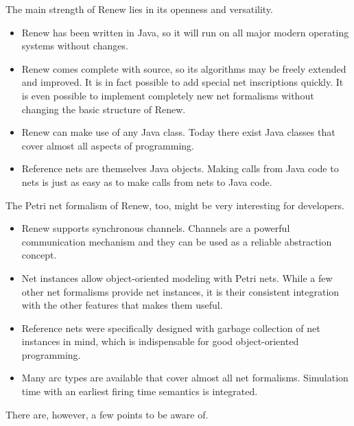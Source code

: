 The main strength of Renew lies in its openness and versatility.
\begin{itemize}
\item Renew has been written in Java, so it will run on all
major modern operating systems without changes.

\item Renew comes complete with source, so its algorithms may 
be freely extended and improved. It is in fact possible
to add special net inscriptions quickly. It is even possible
to implement completely new net formalisms without changing
the basic structure of Renew.

\item Renew can make use of any Java class. Today there exist
Java classes that cover almost all aspects of programming.

\item Reference nets are themselves Java objects. Making
calls from Java code to nets is just as easy as to make calls
from nets to Java code.
\end{itemize}
The Petri net formalism of Renew, too, might be very interesting for
developers.
\begin{itemize}
\item Renew supports synchronous channels.
Channels are a powerful communication mechanism and they can be used as
a reliable abstraction concept.

\item Net instances allow object-oriented modeling with Petri nets.
While a few other net formalisms provide net instances, it is their 
consistent integration with the other features that makes them useful.

\item Reference nets were specifically designed with garbage
collection of net instances in mind, which is indispensable for
good object-oriented programming.

\item Many arc types are available that cover almost all
net formalisms. Simulation time with an earliest firing time
semantics is integrated.
\end{itemize}
There are, however, a few points to be aware of.
